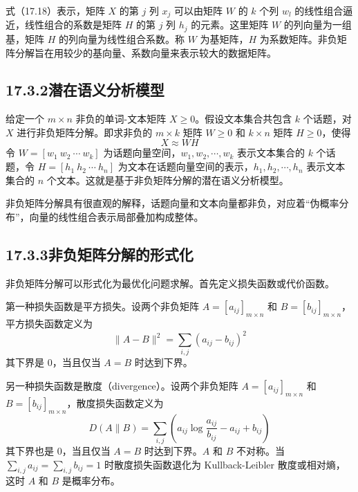 \documentclass[UTF8, 12pt, fontset=fandol, oneside]{ctexart}
\begin{document}
式（17.18）表示，矩阵 $X$ 的第 $j$ 列 $x_j$ 可以由矩阵 $W$ 的 $k$ 个列 $w_l$ 的线性组合逼近，线性组合的系数是矩阵 $H$ 的第 $j$ 列 $h_j$ 的元素。这里矩阵 $W$ 的列向量为一组基，矩阵 $H$ 的列向量为线性组合系数。称 $W$ 为基矩阵，$H$ 为系数矩阵。非负矩阵分解旨在用较少的基向量、系数向量来表示较大的数据矩阵。

\subsection*{17.3.2\quad 潜在语义分析模型}

给定一个 $m\times n$ 非负的单词-文本矩阵 $X\geqslant 0$。假设文本集合共包含 $k$ 个话题，对 $X$ 进行非负矩阵分解。即求非负的 $m\times k$ 矩阵 $W\geqslant 0$ 和 $k\times n$ 矩阵 $H\geqslant 0$，使得
\begin{equation}
X\approx WH
\tag{17.19}
\end{equation}
令 $W=[w_1\ w_2\ \cdots\ w_k]$ 为话题向量空间，$w_1,w_2,\cdots,w_k$ 表示文本集合的 $k$ 个话题，令 $H=[h_1\ h_2\ \cdots\ h_n]$ 为文本在话题向量空间的表示，$h_1,h_2,\cdots,h_n$ 表示文本集合的 $n$ 个文本。这就是基于非负矩阵分解的潜在语义分析模型。

非负矩阵分解具有很直观的解释，话题向量和文本向量都非负，对应着“伪概率分布”，向量的线性组合表示局部叠加构成整体。

\subsection*{17.3.3\quad 非负矩阵分解的形式化}

非负矩阵分解可以形式化为最优化问题求解。首先定义损失函数或代价函数。

第一种损失函数是平方损失。设两个非负矩阵 $A=[a_{ij}]_{m\times n}$ 和 $B=[b_{ij}]_{m\times n}$，平方损失函数定义为
\begin{equation}
\|A-B\|^2=\sum_{i,j}(a_{ij}-b_{ij})^2
\tag{17.20}
\end{equation}
其下界是 0，当且仅当 $A=B$ 时达到下界。

另一种损失函数是散度（divergence）。设两个非负矩阵 $A=[a_{ij}]_{m\times n}$ 和 $B=[b_{ij}]_{m\times n}$，散度损失函数定义为
\begin{equation}
D(A\|B)=\sum_{i,j}\left(a_{ij}\log\frac{a_{ij}}{b_{ij}}-a_{ij}+b_{ij}\right)
\tag{17.21}
\end{equation}
其下界也是 0，当且仅当 $A=B$ 时达到下界。$A$ 和 $B$ 不对称。当 $\sum_{i,j}a_{ij}=\sum_{i,j}b_{ij}=1$ 时散度损失函数退化为 Kullback-Leibler 散度或相对熵，这时 $A$ 和 $B$ 是概率分布。
\end{document}
